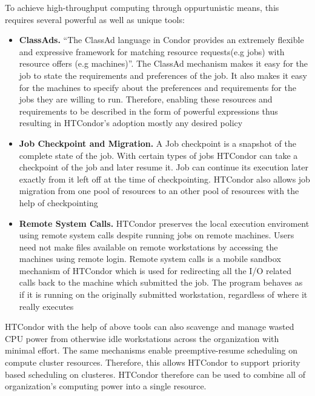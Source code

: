 \documentclass[9pt,twocolumn,twoside]{../../styles/osajnl}
\begin{document}
To achieve high-throughput computing through oppurtunistic means, this
requires several powerful as well as unique tools:

\begin{itemize}

\item {\bf ClassAds.} ``The ClassAd language in Condor provides an
  extremely flexible and expressive framework for matching resource
  requests(e.g jobs) with resource offers (e.g
  machines)''\cite{condor-practice}.  The ClassAd mechanism makes it
  easy for the job to state the requirements and preferences of the
  job. It also makes it easy for the machines to specify about the
  preferences and requirements for the jobs they are willing to run.
  Therefore, enabling these resources and requirements to be described
  in the form of powerful expressions thus resulting in HTCondor's
  adoption mostly any desired policy\cite{condor-practice}
  
\item {\bf Job Checkpoint and Migration.} A Job checkpoint is a
  snapshot of the complete state of the
  job\cite{Checkpoint_Migration_techreport_1997}. With certain types
  of jobs HTCondor can take a checkpoint of the job and later resume
  it. Job can continue its execution later exactly from it left off at
  the time of checkpointing. HTCondor also allows job migration from
  one pool of resources to an other pool of resources with the help of
  checkpointing\cite{beowulfbook-condor}

\item {\bf Remote System Calls.} HTCondor preserves the local
  execution enviroment using remote system calls despite running jobs
  on remote machines. Users need not make files available on remote
  workstations by accessing the machines using remote login. Remote
  system calls is a mobile sandbox mechanism of HTCondor which is used
  for redirecting all the I/O related calls back to the machine which
  submitted the job. The program behaves as if it is running on the
  originally submitted workstation, regardless of where it really
  executes\cite{condor-practice}
  
\end{itemize}

HTCondor with the help of above tools can also scavenge and manage
wasted CPU power from otherwise idle workstations across the
organization with minimal effort\cite{condor-hunter}. The same
mechanisms enable preemptive-resume scheduling on compute cluster
resources. Therefore, this allows HTCondor to support priority based
scheduling on clusteres. HTCondor therefore can be used to combine all
of organization's computing power into a single resource.
\end{document}
